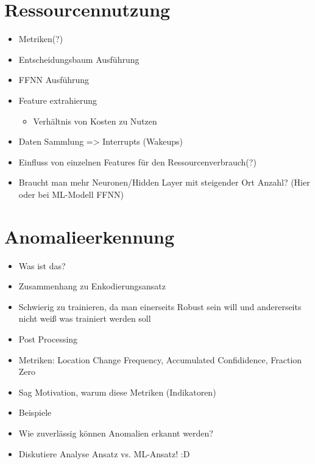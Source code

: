 \section{Ressourcennutzung}
\begin{itemize}
    \item Metriken(?)
    \item Entscheidungsbaum Ausführung
    \item FFNN Ausführung
    \item Feature extrahierung
    \begin{itemize}
        \item Verhältnis von Kosten zu Nutzen
    \end{itemize}
    \item Daten Sammlung => Interrupts (Wakeups)
    \item Einfluss von einzelnen Features für den Ressourcenverbrauch(?)
    \item Braucht man mehr Neuronen/Hidden Layer mit steigender Ort Anzahl? (Hier oder bei ML-Modell FFNN)
\end{itemize}

\section{Anomalieerkennung}
\label{sec:eval_anomalieerkennung}
\begin{itemize}
    \item Was ist das?
    \item Zusammenhang zu Enkodierungsansatz
    \item Schwierig zu trainieren, da man einerseits Robust sein will und andererseits nicht weiß was trainiert werden soll
    \item Post Processing
    \item Metriken: Location Change Frequency, Accumulated Confididence, Fraction Zero
    \item Sag Motivation, warum diese Metriken (Indikatoren)
    \item Beispiele
    \item Wie zuverlässig können Anomalien erkannt werden?
    \item Diskutiere Analyse Ansatz vs. ML-Ansatz! :D
\end{itemize}